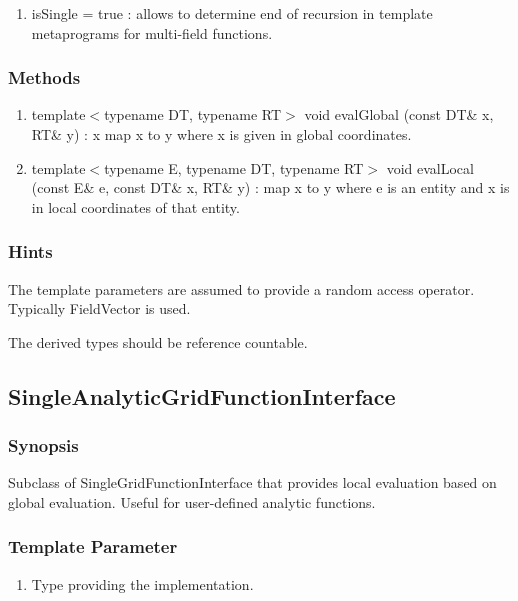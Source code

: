 \documentclass[11pt,a4paper,DIV11,%
notitlepage,oneside,abstracton,%
bibtotoc]{scrartcl}
\begin{document}
\begin{enumerate}[1)]
\item isSingle = true : allows to determine end of recursion in
  template metaprograms for multi-field functions.
\end{enumerate}

\subsubsection{Methods}

\begin{enumerate}[1)]
\item template$<$typename DT, typename RT$>$ void evalGlobal (const
  DT\& x, RT\& y) : x map x to y where x is given in global
  coordinates.
\item template$<$typename E, typename DT, typename RT$>$ void
  evalLocal (const E\& e, const DT\& x, RT\& y) : map x to y where e
  is an entity and x is in local coordinates of that entity.
\end{enumerate}

\subsubsection{Hints}

The template parameters are assumed to provide a random access
operator. Typically FieldVector is used.

The derived types should be reference countable.

\subsection{SingleAnalyticGridFunctionInterface}

\subsubsection{Synopsis}

Subclass of SingleGridFunctionInterface that provides local evaluation
based on global evaluation. Useful for user-defined analytic functions.

\subsubsection{Template Parameter}

\begin{enumerate}[1)]
\item Type providing the implementation.
\end{enumerate}
\end{document}
